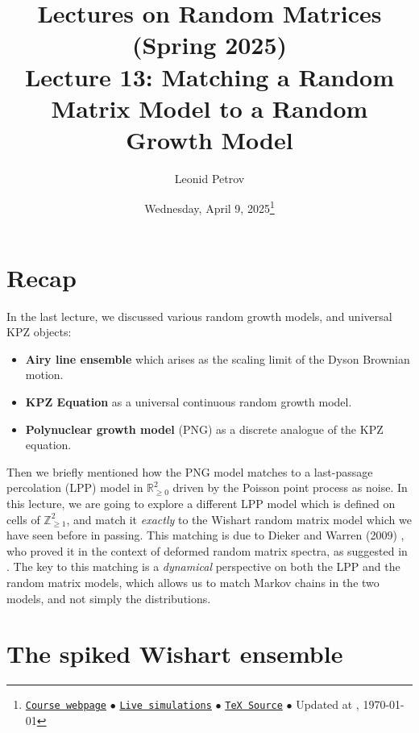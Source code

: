 \documentclass[letterpaper,11pt,oneside,reqno]{article}
\numberwithin{equation}{section}
\theoremstyle{definition}
\begin{document}
\title{Lectures on Random Matrices
(Spring 2025)
\\Lecture 13: Matching a Random Matrix Model to a Random Growth Model}


\date{Wednesday, April 9, 2025\footnote{\href{https://lpetrov.cc/rmt25/}{\texttt{Course webpage}}
$\bullet$ \href{https://lpetrov.cc/simulations/model/random-matrices/}{\texttt{Live simulations}}
$\bullet$ \href{https://lpetrov.cc/rmt25/rmt25-notes/rmt2025-l13.tex}{\texttt{TeX Source}}
$\bullet$
Updated at \currenttime, \today}}



\author{Leonid Petrov}


\maketitle

\section{Recap}

In the last lecture, we discussed various random growth models, and universal KPZ objects:
\begin{itemize}
	\item \textbf{Airy line ensemble} which arises as the scaling limit of the Dyson Brownian motion.
	\item \textbf{KPZ Equation} as a universal continuous random growth model.
	\item \textbf{Polynuclear growth model} (PNG) as a discrete analogue of the KPZ equation.
\end{itemize}

Then we briefly mentioned how the PNG model matches to a
last-passage percolation (LPP) model in
$\mathbb{R}^2_{\ge0}$ driven by the Poisson
point process as noise.
In this lecture, we are going to explore a different
LPP model which is defined on cells of $\mathbb{Z}_{\ge1}^{2}$, and
match it \emph{exactly} to the Wishart random matrix model which we have seen before in passing.
This matching is due to Dieker and Warren (2009)
\cite{diekerWarren2008determinantal}, who proved it 
in the context
of deformed random matrix spectra, 
as suggested in
\cite{BorodinPeche2009}.
The key to this matching is a \emph{dynamical} perspective 
on both the LPP and the random matrix models, which allows us to
match Markov chains in the two models, and not simply the distributions.


\section{The spiked Wishart ensemble}
\end{document}
